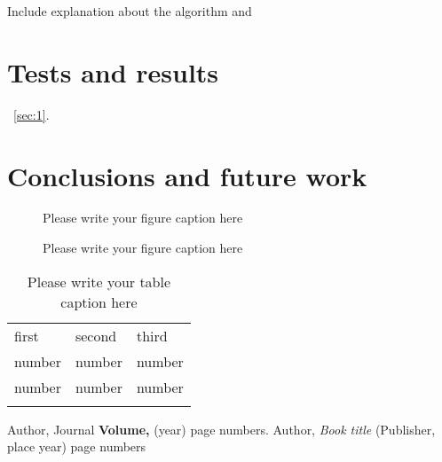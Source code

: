 Include explanation about the algorithm
and \cite{RefJ}

\section{Tests and results}
\label{sec:results}

~\ref{sec:1}.

\section{Conclusions and future work}
\label{sec:conclusions}

%
\begin{figure}
\caption{Please write your figure caption here}
\label{fig:1}       %
\end{figure}
%
\begin{figure*}
\vspace*{5cm}       %
\caption{Please write your figure caption here}
\label{fig:2}       %
\end{figure*}
%
\begin{table}
\caption{Please write your table caption here}
\label{tab:1}       %
\begin{tabular}{lll}
\hline\noalign{\smallskip}
first & second & third  \\
\noalign{\smallskip}\hline\noalign{\smallskip}
number & number & number \\
number & number & number \\
\noalign{\smallskip}\hline
\end{tabular}
\vspace*{5cm}  %
\end{table}
%
% 
% 
%
\begin{thebibliography}{}
%
%
Author, Journal \textbf{Volume,} (year) page numbers.
Author, \textit{Book title} (Publisher, place year) page numbers
\end{thebibliography}





